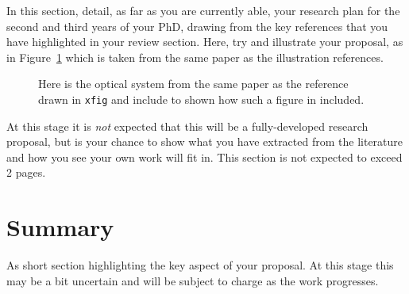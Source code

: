 \documentclass[a4paper,12pt]{article}
\begin{document}
In this section, detail, as far as you are currently able, 
your research plan for the second and third years of your PhD, 
drawing from the key references \cite{jr:block} that you have highlighted in your review section. 
Here, try and illustrate
your proposal, as in Figure~\ref{fig:prism} which is taken from the
same paper as the illustration references.
%
%
\begin{figure}[htb]     %
        \begin{center}
          \epsfxsize=100mm         %
\end{center}
\caption{Here is the optical system from the same paper
  as the reference drawn in {\tt xfig} and include to
  shown how such a figure in included.}
\label{fig:prism}                 %
\end{figure}

At this stage it is {\em not} expected that this will be a fully-developed
research proposal, but is your chance to show what you have extracted from the
literature and how you see your own work will fit in. This section is
not expected to exceed 2 pages.
 
\section{Summary}

As short section highlighting the key aspect of your proposal.
At this stage this may be a bit uncertain and will be subject
to charge as the work progresses.


\end{document}

